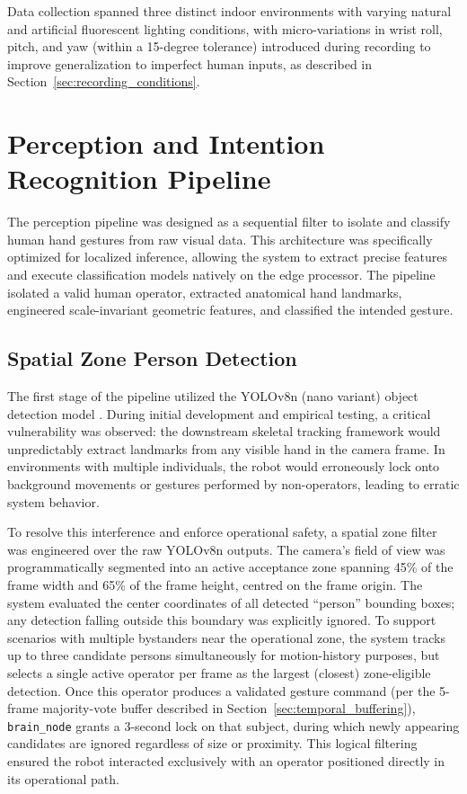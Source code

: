 Data collection spanned three distinct indoor environments with varying natural and
artificial fluorescent lighting conditions, with micro-variations in wrist roll,
pitch, and yaw (within a 15-degree tolerance) introduced during recording to improve
generalization to imperfect human inputs, as described in
Section~\ref{sec:recording_conditions}.

\section{Perception and Intention Recognition Pipeline}
The perception pipeline was designed as a sequential filter to isolate and classify human hand gestures from raw visual data. This architecture was specifically optimized for localized inference, allowing the system to extract precise features and execute classification models natively on the edge processor. The pipeline isolated a valid human operator, extracted anatomical hand landmarks, engineered scale-invariant geometric features, and classified the intended gesture.

\subsection{Spatial Zone Person Detection}
The first stage of the pipeline utilized the YOLOv8n (nano variant) object detection model \cite{yolov8_ultralytics}. During initial development and empirical testing, a critical vulnerability was observed: the downstream skeletal tracking framework would unpredictably extract landmarks from any visible hand in the camera frame. In environments with multiple individuals, the robot would erroneously lock onto background movements or gestures performed by non-operators, leading to erratic system behavior.

To resolve this interference and enforce operational safety, a spatial zone filter was engineered over the raw YOLOv8n outputs. The camera's field of view was programmatically segmented into an active acceptance zone spanning 45\% of the frame width and 65\% of the frame height, centred on the frame origin. The system evaluated the center coordinates of all detected ``person'' bounding boxes; any detection falling outside this boundary was explicitly ignored. To support scenarios with multiple bystanders near the operational zone, the system
tracks up to three candidate persons simultaneously for motion-history purposes, but
selects a single active operator per frame as the largest (closest) zone-eligible
detection. Once this operator produces a validated gesture command (per the 5-frame
majority-vote buffer described in Section~\ref{sec:temporal_buffering}),
\texttt{brain\_node} grants a 3-second lock on that subject, during which newly
appearing candidates are ignored regardless of size or proximity. This logical filtering ensured the robot interacted exclusively with an operator positioned directly in its operational path. 

